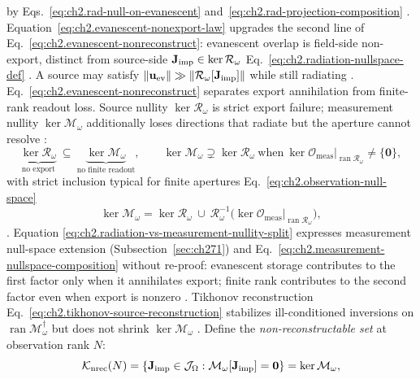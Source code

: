 by Eqs.~\eqref{eq:ch2.rad-null-on-evanescent} and~\eqref{eq:ch2.rad-projection-composition}
\cite{stratton1941}. Equation~\eqref{eq:ch2.evanescent-nonexport-law} upgrades the second
line of Eq.~\eqref{eq:ch2.evanescent-nonreconstruct}: evanescent overlap is
field-side non-export, distinct from source-side \(\mathbf{J}_{\mathrm{imp}}\in\ker\mathcal{R}_\omega\)
Eq.~\eqref{eq:ch2.radiation-nullspace-def} \cite{harrington2001}. A source may satisfy
\(\|\mathbf{u}_{\mathrm{ev}}\|\gg\|\mathcal{R}_\omega[\mathbf{J}_{\mathrm{imp}}]\|\) while still radiating
\cite{stratton1941}.
Eq.~\eqref{eq:ch2.evanescent-nonreconstruct} separates export annihilation from
finite-rank readout loss. Source nullity \(\ker\mathcal{R}_\omega\) is strict export failure;
measurement nullity \(\ker\mathcal{M}_\omega\) additionally loses directions that radiate but
the aperture cannot resolve \cite{stratton1941}:
\begin{equation}
\label{eq:ch2.radiation-vs-measurement-nullity-split}
\underbrace{\ker\mathcal{R}_\omega}_{\text{no export}}
\ \subseteq\
\underbrace{\ker\mathcal{M}_\omega}_{\text{no finite readout}},
\qquad
\ker\mathcal{M}_\omega
\supsetneq
\ker\mathcal{R}_\omega
\ \text{when}\ 
\ker\mathcal{O}_{\mathrm{meas}}\big|_{\operatorname{ran}\mathcal{R}_\omega}\neq\{\mathbf{0}\},
\end{equation}
with strict inclusion typical for finite apertures
Eq.~\eqref{eq:ch2.observation-null-space}
\begin{equation}
\label{eq:ch2.measurement-nullspace-composition}
\ker\mathcal{M}_\omega
=
\ker\mathcal{R}_\omega
\ \cup\
\mathcal{R}_\omega^{-1}\!\big(\ker\mathcal{O}_{\mathrm{meas}}\big|_{\operatorname{ran}\mathcal{R}_\omega}\big),
\end{equation} \cite{stratton1941}. Equation
\eqref{eq:ch2.radiation-vs-measurement-nullity-split} expresses measurement null-space extension (Subsection~\ref{sec:ch271}) and
Eq.~\eqref{eq:ch2.measurement-nullspace-composition} without re-proof: evanescent storage
contributes to the first factor only when it annihilates export; finite rank contributes to
the second factor even when export is nonzero \cite{stratton1941}. Tikhonov reconstruction
Eq.~\eqref{eq:ch2.tikhonov-source-reconstruction} stabilizes ill-conditioned inversions on
\(\operatorname{ran}\mathcal{M}_\omega^{\dagger}\) but does not shrink
\(\ker\mathcal{M}_\omega\) \cite{harrington2001}.
Define the \emph{non-reconstructable set} at observation rank \(N\):
\begin{equation}
\label{eq:ch2.nonreconstruct-observation-kernel}
\mathcal{K}_{\mathrm{nrec}}(N)
=
\left\{
\mathbf{J}_{\mathrm{imp}}\in\mathcal{J}_\Omega:
\mathcal{M}_\omega[\mathbf{J}_{\mathrm{imp}}]=\mathbf{0}
\right\}
=
\ker\mathcal{M}_\omega,
\end{equation}
